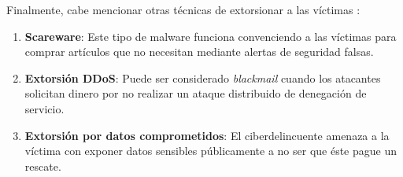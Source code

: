 Finalmente, cabe mencionar otras técnicas de extorsionar a las víctimas \cite{ransommasive}:

\begin{enumerate}
    \item \textbf{Scareware}: Este tipo de malware funciona convenciendo a las víctimas para comprar artículos que no necesitan mediante alertas de seguridad falsas.
    
    \item \textbf{Extorsión DDoS}: Puede ser considerado \textit{blackmail} cuando los atacantes solicitan dinero por no realizar un ataque distribuido de denegación de servicio.
    
    \item \textbf{Extorsión por datos comprometidos}: El ciberdelincuente amenaza a la víctima con exponer datos sensibles públicamente a no ser que éste pague un rescate.
\end{enumerate}


